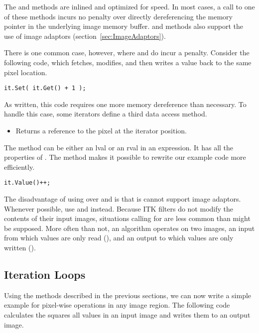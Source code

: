 The  and  methods are inlined and optimized for speed. In
most cases, a call to one of these methods incurs no penalty over directly
dereferencing the memory pointer in the underlying image memory buffer.
 and  methods also support the use of image adaptors
(section~\ref{sec:ImageAdaptors}).

There is one common case, however, where  and  do incur a
penalty. Consider the following code, which fetches, modifies, and then writes
a value back to the same pixel location.

\begin{verbatim}
it.Set( it.Get() + 1 );
\end{verbatim}

As written, this code requires one more memory dereference than necessary.  To
handle this case, some iterators define a third data access method.

\begin{itemize}
\item \textbf{} Returns a reference to the pixel at
the iterator position.
\end{itemize}

The  method can be either an lval or an rval in an expression.  It
has all the properties of .  The  method makes it
possible to rewrite our example code more efficiently.

\begin{verbatim}
it.Value()++;
\end{verbatim}

The disadvantage of using  over  and  is that
is cannot support image adaptors. Whenever possible, use  and
 instead.  Because ITK filters do not modify the contents of their
input images, situations calling for
 are less common than might be supposed.  More often than not, an
algorithm operates on two images, an input from which values are only read
(), and an output to which values are only written ().


\subsection{Iteration Loops}
\label{sec:IterationExample}
Using the methods described in the previous sections, we can now write a simple
example for pixel-wise operations in any image region.  The following code
calculates the squares all values in an input image and writes them to an
output image.

